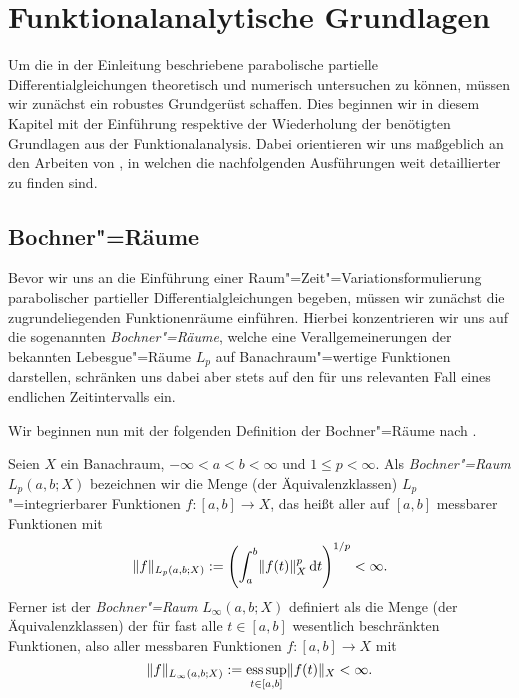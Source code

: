 \documentclass[../main.tex]{subfiles}
\begin{document}
\chapter{Funktionalanalytische Grundlagen} %
\label{chapter:grundlagen}

Um die in der Einleitung beschriebene parabolische partielle Differentialgleichungen theoretisch und numerisch untersuchen zu können, müssen wir zunächst ein robustes Grundgerüst schaffen.
Dies beginnen wir in diesem Kapitel mit der Einführung respektive der Wiederholung der benötigten Grundlagen aus der Funktionalanalysis.
Dabei orientieren wir uns maßgeblich an den Arbeiten von \textcite{Dautray:1992by,Schweizer2013}, in welchen die nachfolgenden Ausführungen weit detaillierter zu finden sind.


\section{Bochner"=Räume} %
\label{section:bochner_raeume}

Bevor wir uns an die Einführung einer Raum"=Zeit"=Variationsformulierung parabolischer partieller Differentialgleichungen begeben, müssen wir zunächst die zugrundeliegenden Funktionenräume einführen.
Hierbei konzentrieren wir uns auf die sogenannten \emph{Bochner"=Räume}, welche eine Verallgemeinerungen der bekannten Lebesgue"=Räume $L_{p}$ auf Banachraum"=wertige Funktionen darstellen, schränken uns dabei aber stets auf den für uns relevanten Fall eines endlichen Zeitintervalls ein.

Wir beginnen nun mit der folgenden Definition der Bochner"=Räume nach \cite[Definition XVIII.1.1]{Dautray:1992by}.

\begin{Definition}
\label{definition:bochner_raum}
    Seien $X$ ein Banachraum, $- \infty < a < b < \infty$ und $1 \leq p < \infty$.
    Als \emph{Bochner"=Raum} $L_{p}(a, b; X)$ bezeichnen wir die Menge (der Äquivalenzklassen) $L_{p}$"=integrierbarer Funktionen $f \colon [a, b] \to X$, das heißt aller auf $[a, b]$ messbarer Funktionen mit
    \begin{equation}
        \lVert f\rVert_{L_{p}(a, b; X)} := \left( \int_{a}^{b} \lVert f(t)\rVert_{X}^{p} \mathop{}\!\mathrm{d} t \right)^{1 / p} < \infty.
    \end{equation}
    Ferner ist der \emph{Bochner"=Raum} $L_{\infty}(a, b; X)$ definiert als die Menge (der Äquivalenzklassen) der für fast alle $t \in [a, b]$ wesentlich beschränkten Funktionen, also aller messbaren Funktionen $f \colon [a, b] \to X$ mit
    \begin{equation}
        \lVert f\rVert_{L_{\infty}(a, b; X)} := \operatorname*{ess\,sup}_{t \in [a, b]} \lVert f(t)\rVert_{X} < \infty.
    \end{equation}
\end{Definition}
\end{document}
